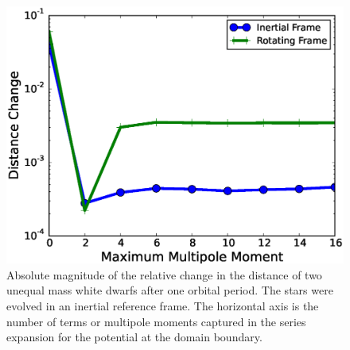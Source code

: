 \documentclass[12pt]{article}
\begin{document}
\begin{figure}[h!]
  \centering
  \includegraphics[scale=0.8,trim=0.1in 0.0in 0.65in 0.4in,clip]{plots/gravity_bcs}
  \caption[Distance change due to multipole boundary conditions]
          {Absolute magnitude of the relative change in the distance of two unequal mass white dwarfs after one orbital period.
           The stars were evolved in an inertial reference frame. The horizontal axis is the number of terms or multipole moments
           captured in the series expansion for the potential at the domain boundary.\label{fig:gravity_bcs}}
\end{figure}
\end{document}
